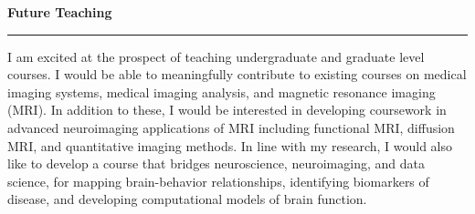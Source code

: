 \documentclass[letterpaper,11pt]{article}
\begin{document}
\textbf{\Large{Future Teaching}} \smallskip \hrule \medskip

I am excited at the prospect of teaching undergraduate and graduate level courses. I would be able to meaningfully contribute to existing courses on medical imaging systems, medical imaging analysis, and magnetic resonance imaging (MRI). In addition to these, I would be interested in developing coursework in advanced neuroimaging applications of MRI including functional MRI, diffusion MRI, and quantitative imaging methods. In line with my research, I would also like to develop a course that bridges neuroscience, neuroimaging, and data science, for mapping brain-behavior relationships, identifying biomarkers of disease, and developing computational models of brain function.
\end{document}

